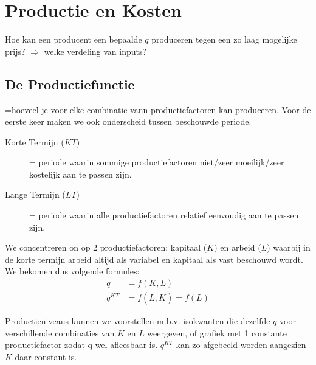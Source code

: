 \section{Productie en Kosten}
\label{sec:productieEnKosten}
Hoe kan een producent een bepaalde $q$ produceren tegen een zo laag mogelijke prijs? $\Rightarrow$ welke verdeling van inputs?

\subsection{De Productiefunctie}
=hoeveel je voor elke combinatie vann productiefactoren kan produceren. Voor de eerste keer maken we ook onderscheid tussen beschouwde periode.
\begin{description}
	\item[Korte Termijn ($KT$)] = periode waarin sommige productiefactoren niet/zeer moeilijk/zeer kostelijk aan te passen zijn.
	\item[Lange Termijn ($LT$)] = periode waarin alle productiefactoren relatief eenvoudig aan te passen zijn.
\end{description}
We concentreren on op 2 productiefactoren: kapitaal ($K$) en arbeid ($L$) waarbij in de korte termijn arbeid altijd als variabel en kapitaal als vast beschouwd wordt. We bekomen dus volgende formules:
\begin{align}
	q &= f(K,L)\\
	q^{KT} &= f(L,\overline{K}) = f(L)
\end{align}

Productieniveaus kunnen we voorstellen m.b.v. isokwanten die dezelfde $q$ voor verschillende combinaties van $K$ en $L$ weergeven, of grafiek met 1 constante productiefactor zodat q wel afleesbaar is. $q^{KT}$ kan zo afgebeeld worden aangezien $K$ daar constant is.

